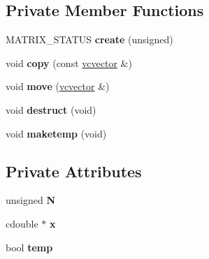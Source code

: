 \subsection*{Private Member Functions}
\begin{DoxyCompactItemize}
\item 
M\+A\+T\+R\+I\+X\+\_\+\+S\+T\+A\+T\+US {\bfseries create} (unsigned)\hypertarget{classvcvector_af4865e9e1a307d2d4aa8b614b8aacef8}{}\label{classvcvector_af4865e9e1a307d2d4aa8b614b8aacef8}

\item 
void {\bfseries copy} (const \hyperlink{classvcvector}{vcvector} \&)\hypertarget{classvcvector_a1813378314b76c499f9c3e3dac608e5d}{}\label{classvcvector_a1813378314b76c499f9c3e3dac608e5d}

\item 
void {\bfseries move} (\hyperlink{classvcvector}{vcvector} \&)\hypertarget{classvcvector_ae371bb551b0f4433fc2cb06f5f6415d4}{}\label{classvcvector_ae371bb551b0f4433fc2cb06f5f6415d4}

\item 
void {\bfseries destruct} (void)\hypertarget{classvcvector_aecf2f6604e31071acb661cbeb13d8803}{}\label{classvcvector_aecf2f6604e31071acb661cbeb13d8803}

\item 
void {\bfseries maketemp} (void)\hypertarget{classvcvector_abbd8513ba121dbc730147ae6ee23e202}{}\label{classvcvector_abbd8513ba121dbc730147ae6ee23e202}

\end{DoxyCompactItemize}
\subsection*{Private Attributes}
\begin{DoxyCompactItemize}
\item 
unsigned {\bfseries N}\hypertarget{classvcvector_af6682337d92252792a495020c1ce91e9}{}\label{classvcvector_af6682337d92252792a495020c1ce91e9}

\item 
cdouble $\ast$ {\bfseries x}\hypertarget{classvcvector_abb317c4ca6d63f77b0a33ddc81b24e37}{}\label{classvcvector_abb317c4ca6d63f77b0a33ddc81b24e37}

\item 
bool {\bfseries temp}\hypertarget{classvcvector_ab35e00d4e88fd81b3d4591b3ee6404d3}{}\label{classvcvector_ab35e00d4e88fd81b3d4591b3ee6404d3}

\end{DoxyCompactItemize}
